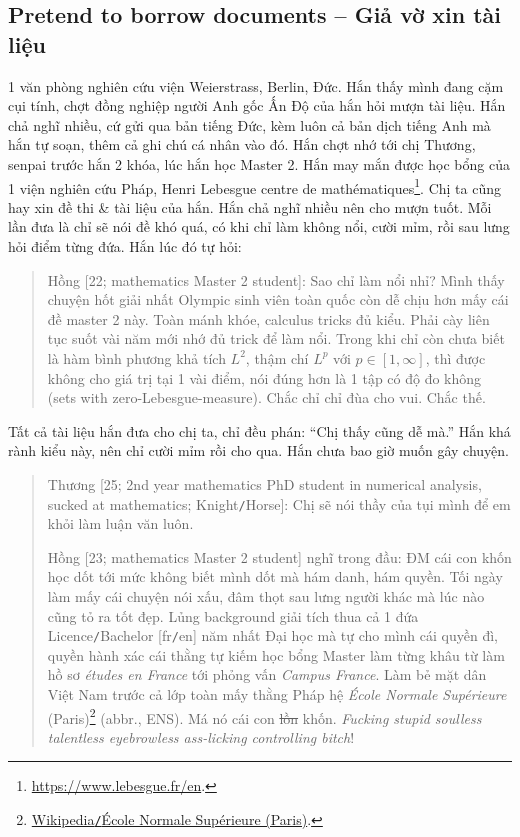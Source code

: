 \documentclass[12pt,oneside]{book}
\begin{document}
\subsection{Pretend to borrow documents -- Giả vờ xin tài liệu}
1 văn phòng nghiên cứu viện {\sc Weierstrass}, Berlin, Đức. Hắn thấy mình đang cặm cụi tính, chợt đồng nghiệp người Anh gốc Ấn Độ của hắn hỏi mượn tài liệu. Hắn chả nghĩ nhiều, cứ gửi qua bản tiếng Đức, kèm luôn cả bản dịch tiếng Anh mà hắn tự soạn, thêm cả ghi chú cá nhân vào đó. Hắn chợt nhớ tới chị Thương, senpai trước hắn 2 khóa, lúc hắn học Master 2. Hắn may mắn được học bổng của 1 viện nghiên cứu Pháp, {\sc Henri Lebesgue centre de math\'ematiques}\footnote{\url{https://www.lebesgue.fr/en}.}. Chị ta cũng hay xin đề thi \& tài liệu của hắn. Hắn chả nghĩ nhiều nên cho mượn tuốt. Mỗi lần đưa là chỉ sẽ nói đề khó quá, có khi chỉ làm không nổi, cười mỉm, rồi sau lưng hỏi điểm từng đứa. Hắn lúc đó tự hỏi:
\begin{quote}
	{\sf Hồng [22; mathematics Master 2 student]}: Sao chỉ làm nổi nhỉ? Mình thấy chuyện hốt giải nhất Olympic sinh viên toàn quốc còn dễ chịu hơn mấy cái đề master 2 này. Toàn mánh khóe, calculus tricks đủ kiểu. Phải cày liên tục suốt vài năm mới nhớ đủ trick để làm nổi. Trong khi chỉ còn chưa biết là hàm bình phương khả tích $L^2$, thậm chí $L^p$ với $p\in[1,\infty]$, thì được không cho giá trị tại 1 vài điểm, nói đúng hơn là 1 tập có độ đo không (sets with zero-Lebesgue-measure). Chắc chỉ chỉ đùa cho vui. Chắc thế.
\end{quote}
Tất cả tài liệu hắn đưa cho chị ta, chỉ đều phán: ``Chị thấy cũng dễ mà.'' Hắn khá rành kiểu này, nên chỉ cười mỉm rồi cho qua. Hắn chưa bao giờ muốn gây chuyện.
\begin{quote}
	{\sf Thương [25; 2nd year mathematics PhD student in numerical analysis, sucked at mathematics; Knight{\tt/}Horse]}: Chị sẽ nói thầy của tụi mình để em khỏi làm luận văn luôn.
	
	{\sf Hồng [23; mathematics Master 2 student]} nghĩ trong đầu: ĐM cái con khốn học dốt tới mức không biết mình dốt mà hám danh, hám quyền. Tối ngày làm mấy cái chuyện nói xấu, đâm thọt sau lưng người khác mà lúc nào cũng tỏ ra tốt đẹp. Lủng background giải tích thua cả 1 đứa Licence{\tt/}Bachelor [fr{\tt/}en] năm nhất Đại học mà tự cho mình cái quyền đì, quyền hành xác cái thằng tự kiếm học bổng Master làm từng khâu từ làm hồ sơ {\it \'etudes en France} tới phỏng vấn {\it Campus France}. Làm bẻ mặt dân Việt Nam trước cả lớp toàn mấy thằng Pháp hệ {\it École Normale Supérieure} (Paris)\footnote{\href{https://en.wikipedia.org/wiki/Ecole_normale_superieure_(Paris)}{Wikipedia{\tt/}École Normale Supérieure (Paris)}.} (abbr., ENS). Má nó cái con \st{lồn} khốn. {\it Fucking stupid soulless talentless eyebrowless ass-licking controlling bitch}!
\end{quote}
\end{document}
